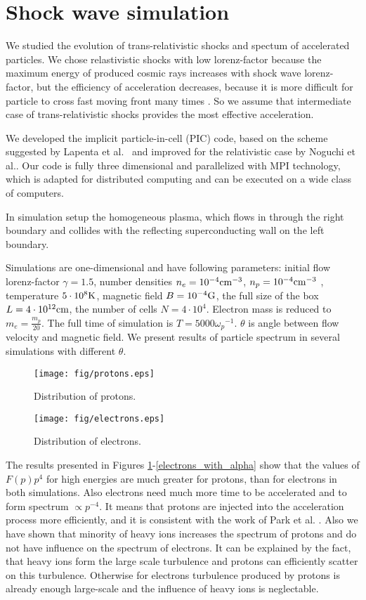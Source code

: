 \section{Shock wave simulation}
We studied the evolution of trans-relativistic shocks and spectum of accelerated particles. We chose relastivistic shocks with low lorenz-factor because the maximum energy of produced cosmic rays increases with shock wave lorenz-factor, but the efficiency of acceleration decreases, because it is more difficult for particle to cross fast moving front many times \cite{Ellison2013}. So we assume that intermediate case of trans-relativistic shocks provides the most effective acceleration.

We developed the implicit particle-in-cell (PIC) code, based on the scheme suggested by Lapenta et al.~\cite{Lapenta2006} and improved for the relativistic case by Noguchi et al.\cite{Noguchi2007}.
Our code is fully three dimensional and parallelized with MPI technology, which is adapted for distributed computing and can be executed on a wide class of computers.

In simulation setup the homogeneous plasma, which flows in through the right boundary
and collides with the reflecting superconducting wall on the left boundary. 
  
 Simulations are one-dimensional and have following parameters: initial flow lorenz-factor $\gamma = 1.5$, number densities $n_e = 10^{-4} \rm{cm}^{-3}$, $n_p = 10^{-4} \rm{cm}^{-3}$ , temperature $5\cdot10^8 \rm{K}$, magnetic field $B = 10^{-4} \rm{G}$, the full size of the box $L = 4\cdot10^{12} \rm{cm}$, the number of cells $N=4\cdot10^4$. Electron mass is reduced to $m_e = \frac{m_p}{20}$. The full time of simulation is $T = 5000 {\omega_p}^{-1}$. $\theta$ is angle between flow velocity and magnetic field. We present results of particle spectrum in several simulations with different $\theta$. 
\begin{figure}[h!]
	\centering
	\texttt{[image: fig/protons.eps]} 
	\caption{Distribution of protons.}
	\label{protons}
\end{figure}
\begin{figure}[h!]
	\centering
	\texttt{[image: fig/electrons.eps]} 
	\caption{Distribution of electrons.}
	\label{electrons}
\end{figure}

The results presented in Figures \ref{protons}-\ref{electrons_with_alpha} show that the values of $F(p)p^4$ for high energies are much greater for protons, than for electrons in both simulations. Also electrons need much more time to be accelerated and to form spectrum $\propto p^{-4}$. It means that protons are injected into the acceleration process more efficiently, and it is consistent with the work of Park et al. {\cite{Park2015}}. Also we have shown that minority of heavy ions increases the spectrum of protons and do not have influence on the spectrum of electrons. It can be explained by the fact, that heavy ions form the large scale turbulence and protons can efficiently scatter on this turbulence. Otherwise for electrons turbulence produced by protons is already enough large-scale  and the influence of heavy ions is neglectable. 
